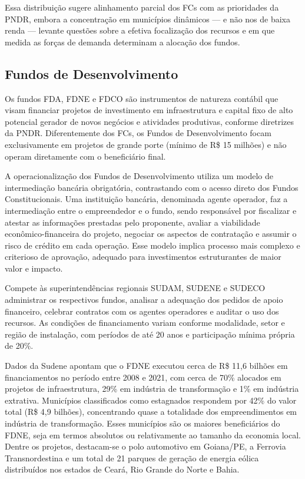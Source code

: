 Essa distribuição sugere alinhamento parcial dos FCs com as prioridades da PNDR, embora a concentração em municípios dinâmicos --- e não nos de baixa renda --- levante questões sobre a efetiva focalização dos recursos e em que medida as forças de demanda determinam a alocação dos fundos.

\subsection{Fundos de Desenvolvimento}
\label{subsec:fds}

Os fundos FDA, FDNE e FDCO são instrumentos de natureza contábil que visam financiar projetos de investimento em infraestrutura e capital fixo de alto potencial gerador de novos negócios e atividades produtivas, conforme diretrizes da PNDR. Diferentemente dos FCs, os Fundos de Desenvolvimento focam exclusivamente em projetos de grande porte (mínimo de R\$ 15 milhões) e não operam diretamente com o beneficiário final. 

A operacionalização dos Fundos de Desenvolvimento utiliza um modelo de intermediação bancária obrigatória, contrastando com o acesso direto dos Fundos Constitucionais. Uma instituição bancária, denominada agente operador, faz a intermediação entre o empreendedor e o fundo, sendo responsável por fiscalizar e atestar as informações prestadas pelo proponente, avaliar a viabilidade econômico-financeira do projeto, negociar os aspectos de contratação e assumir o risco de crédito em cada operação. Esse modelo implica processo mais complexo e criterioso de aprovação, adequado para investimentos estruturantes de maior valor e impacto. 

Compete às superintendências regionais SUDAM, SUDENE e SUDECO administrar os respectivos fundos, analisar a adequação dos pedidos de apoio financeiro, celebrar contratos com os agentes operadores e auditar o uso dos recursos. As condições de financiamento variam conforme modalidade, setor e região de instalação, com períodos de até 20 anos e participação mínima própria de 20\%.

Dados da Sudene apontam que o FDNE executou cerca de R\$ 11,6 bilhões em financiamentos no período entre 2008 e 2021, com cerca de 70\% alocados em projetos de infraestrutura, 29\% em indústria de transformação e 1\% em indústria extrativa. Municípios classificados como estagnados respondem por 42\% do valor total (R\$ 4,9 bilhões), concentrando quase a totalidade dos empreendimentos em indústria de transformação. Esses municípios são os maiores beneficiários do FDNE, seja em termos absolutos ou relativamente ao tamanho da economia local. Dentre os projetos, destacam-se o polo automotivo em Goiana/PE, a Ferrovia Transnordestina e um total de 21 parques de geração de energia eólica distribuídos nos estados de Ceará, Rio Grande do Norte e Bahia.

